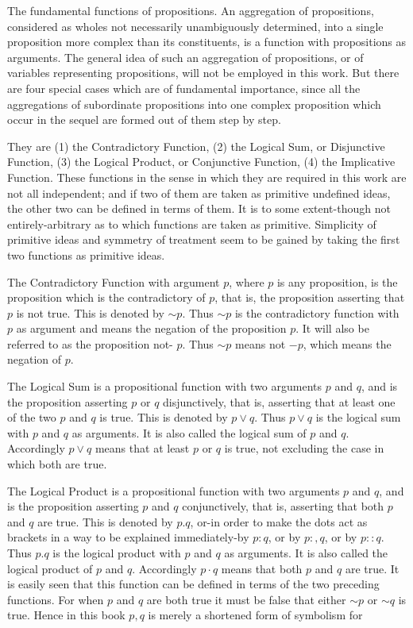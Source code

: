 \documentclass[10pt]{article}
\begin{document}
The fundamental functions of propositions. An aggregation of propositions, considered as wholes not necessarily unambiguously determined, into a single proposition more complex than its constituents, is a function with propositions as arguments. The general idea of such an aggregation of propositions, or of variables representing propositions, will not be employed in this work. But there are four special cases which are of fundamental importance, since all the aggregations of subordinate propositions into one complex proposition which occur in the sequel are formed out of them step by step.

They are (1) the Contradictory Function, (2) the Logical Sum, or Disjunctive Function, (3) the Logical Product, or Conjunctive Function, (4) the Implicative Function. These functions in the sense in which they are required in this work are not all independent; and if two of them are taken as primitive undefined ideas, the other two can be defined in terms of them. It is to some extent-though not entirely-arbitrary as to which functions are taken as primitive. Simplicity of primitive ideas and symmetry of treatment seem to be gained by taking the first two functions as primitive ideas.

The Contradictory Function with argument $p$, where $p$ is any proposition, is the proposition which is the contradictory of $p$, that is, the proposition asserting that $p$ is not true. This is denoted by $\sim p$. Thus $\sim p$ is the contradictory function with $p$ as argument and means the negation of the proposition $p$. It will also be referred to as the proposition not- $p$. Thus $\sim p$ means not $-p$, which means the negation of $p$.

The Logical Sum is a propositional function with two arguments $p$ and $q$, and is the proposition asserting $p$ or $q$ disjunctively, that is, asserting that at least one of the two $p$ and $q$ is true. This is denoted by $p \vee q$. Thus $p \vee q$ is the logical sum with $p$ and $q$ as arguments. It is also called the logical sum of $p$ and $q$. Accordingly $p \vee q$ means that at least $p$ or $q$ is true, not excluding the case in which both are true.

The Logical Product is a propositional function with two arguments $p$ and $q$, and is the proposition asserting $p$ and $q$ conjunctively, that is, asserting that both $p$ and $q$ are true. This is denoted by $p . q$, or-in order to make the dots act as brackets in a way to be explained immediately-by $p: q$, or by $p:, q$, or by $p:: q$. Thus $p . q$ is the logical product with $p$ and $q$ as arguments. It is also called the logical product of $p$ and $q$. Accordingly $p \cdot q$ means that both $p$ and $q$ are true. It is easily seen that this function can be defined in terms of the two preceding functions. For when $p$ and $q$ are both true it must be false that either $\sim p$ or $\sim q$ is true. Hence in this book $p, q$ is merely a shortened form of symbolism for
\end{document}
